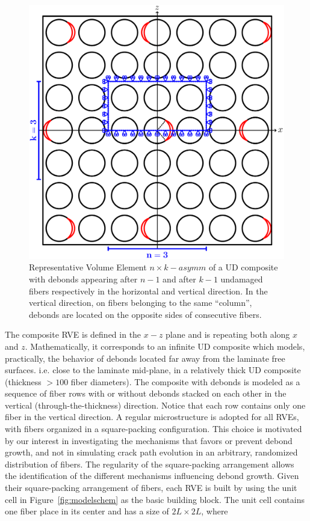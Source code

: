 \documentclass[smallextended]{svjour3}       %
\begin{document}
\begin{figure}[!h]
\centering
\includegraphics[width=\textwidth]{asymm.pdf}
\caption{Representative Volume Element $n\times k-asymm$  of a UD composite with debonds appearing after $n-1$ and after $k-1$ undamaged fibers respectively in the horizontal and vertical direction. In the vertical direction, on fibers belonging to the same ``column'', debonds are located on the opposite sides of consecutive fibers.}\label{fig:laminateModelsB}
\end{figure}

The composite RVE is defined in the $x-z$ plane and is repeating both along $x$ and $z$. Mathematically, it corresponds to an infinite UD composite which models, practically, the behavior of debonds located far away from the laminate free surfaces. i.e. close to the laminate mid-plane, in a relatively thick UD composite (thickness $>100$ fiber diameters). The composite with debonds is modeled as a sequence of fiber rows with or without debonds stacked on each other in the vertical (through-the-thickness) direction. Notice that each row contains only one fiber in the vertical direction. A regular microstructure is adopted for all RVEs, with fibers organized in a square-packing configuration. This choice is motivated by our interest in investigating the mechanisms that favors or prevent debond growth, and not in simulating crack path evolution in an arbitrary, randomized distribution of fibers. The regularity of the square-packing arrangement allows the identification of the different mechanisms influencing debond growth. Given their square-packing arrangement of fibers, each RVE is built by using the unit cell in Figure~\ref{fig:modelschem} as the basic building block. The unit cell contains one fiber place in its center and has a size of $2L\times2L$, where
\end{document}
